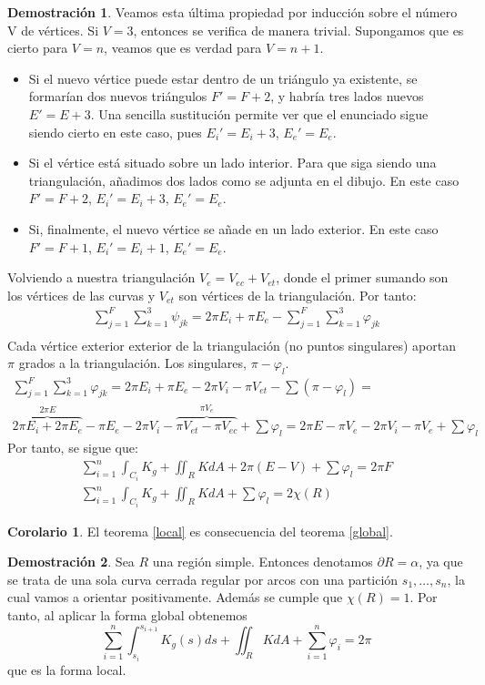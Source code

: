 \documentclass[twoside]{report}
\theoremstyle{definition}
\newtheorem{coro}[theorem]{Corolario}
\newtheorem*{dem}{Demostración}
\numberwithin{equation}{section}
\begin{document}
\begin{dem}
Veamos esta última propiedad por inducción sobre el número V de vértices. Si $V=3$, entonces se verifica de manera trivial. Supongamos que es cierto para $V=n$, veamos que es verdad para $V=n+1$. 
\begin{itemize}
\item Si el nuevo vértice puede estar dentro de un triángulo ya existente, se formarían dos nuevos triángulos $F' = F+2$, y habría tres lados nuevos $E'=E+3$. Una sencilla sustitución permite ver que el enunciado sigue siendo cierto en este caso, pues $E_i' = E_i+3$, $E_e'=E_e$.
\item Si el vértice está situado sobre un lado interior. Para que siga siendo una triangulación, añadimos dos lados como se adjunta en el dibujo. En este caso $F'=F+2$, $E_i'=E_i+3$, $E_e'=E_e$. 
\item Si, finalmente, el nuevo vértice se añade en un lado exterior. En este caso $F'=F+1$, $E_i'=E_i+1$, $E_e'=E_e$.
\end{itemize}
Volviendo a nuestra triangulación $V_e=V_{ec}+V_{et}$, donde el primer sumando son los vértices de las curvas y $V_{et}$ son vértices de la triangulación. Por tanto:
\begin{gather*}
\sum_{j=1}^F\sum_{k=1}^3 \psi_{jk} = 2\pi E_i + \pi E_e - \sum_{j=1}^F\sum_{k=1}^3 \varphi_{jk}\\
\end{gather*}
Cada vértice exterior exterior de la triangulación (no puntos singulares) aportan $\pi$ grados a la triangulación. Los singulares, $\pi - \varphi_l$.
\begin{gather*}
\sum_{j=1}^F\sum_{k=1}^3 \varphi_{jk} =  2\pi E_i + \pi E_e - 2\pi V_i-\pi V_{et} - \sum (\pi - \varphi_l) = \\
\overbrace{ 2\pi E_i + 2\pi E_e }^{2\pi E}- \pi E_e - 2\pi V_i-\overbrace{\pi V_{et}-\pi V_{ec}}^{\pi V_e}  +\sum \varphi_l  = 2\pi E - \pi V_e - 2\pi V_i - \pi V_e + \sum \varphi_l
\end{gather*}
Por tanto, se sigue que:
\begin{gather*}
\sum_{i=1}^n \int_{C_i}K_g + \iint_R K dA +   2\pi( E -V) + \sum \varphi_l = 2\pi F\\
\sum_{i=1}^n \int_{C_i}K_g + \iint_R K dA + \sum \varphi_l = 2 \chi(R)
\end{gather*}
\end{dem}

\begin{coro}
El teorema \ref{local} es consecuencia del teorema \ref{global}. 
\end{coro}
\begin{dem}
Sea $R$ una región simple. Entonces denotamos $\partial R=\alpha$, ya que se trata de una sola curva cerrada regular por arcos con una partición $s_1,\dots, s_n$, la cual vamos a orientar positivamente. Además se cumple que $\chi(R)=1$. Por tanto, al aplicar la forma global obtenemos
\[
\sum_{i=1}^n\int_{s_i}^{s_{i+1}}K_g(s)ds +\iint_R KdA+\sum_{i=1}^n\varphi_i=2\pi
\]
que es la forma local.
\end{dem}
\end{document}
